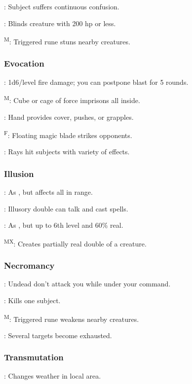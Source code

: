 	: Subject suffers continuous confusion.

	: Blinds creature with 200 hp or less.

	\textsuperscript{M}: Triggered rune stuns nearby creatures.

\subsubsection{Evocation}
	: 1d6/level fire damage; you can postpone blast for 5 rounds.

	\textsuperscript{M}: Cube or cage of force imprisons all inside.

	: Hand provides cover, pushes, or grapples.

	\textsuperscript{F}: Floating magic blade strikes opponents.

	: Rays hit subjects with variety of effects.

\subsubsection{Illusion}
	: As , but affects all in range.

	: Illusory double can talk and cast spells.

	: As , but up to 6th level and 60\% real.

	\textsuperscript{MX}: Creates partially real double of a creature.

\subsubsection{Necromancy}
	: Undead don't attack you while under your command.

	: Kills one subject.

	\textsuperscript{M}: Triggered rune weakens nearby creatures.

	: Several targets become exhausted.

\subsubsection{Transmutation}
	: Changes weather in local area.

